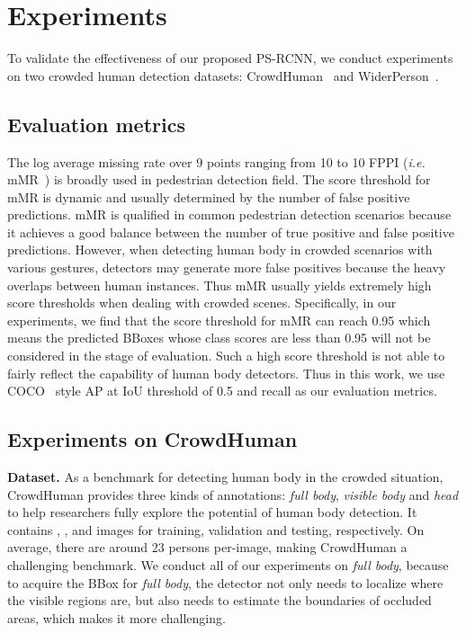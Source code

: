 \documentclass{article}
\begin{document}
\section{Experiments}
\vspace{-0.2cm}

To validate the effectiveness of our proposed PS-RCNN, we conduct experiments on two crowded human detection datasets: CrowdHuman~\cite{CrowdHuman} and WiderPerson~\cite{Zhang2019WiderPerson}.

\subsection{Evaluation metrics}

The log average missing rate over 9 points ranging from 10 to 10 FPPI (\emph{i.e.} mMR~\cite{dollar2011pedestrian}) is broadly used in pedestrian detection field. The score threshold for mMR is dynamic and usually determined by the number of false positive predictions. mMR is qualified in common pedestrian detection scenarios because it achieves a good balance between the number of true positive and false positive predictions. However, when detecting human body in crowded scenarios with various gestures, detectors may generate more false positives because the heavy overlaps between human instances. Thus mMR usually yields extremely high score thresholds when dealing with crowded scenes. Specifically, in our experiments, we find that the score threshold for mMR can reach 0.95 which means the predicted BBoxes whose class scores are less than 0.95 will not be considered in the stage of evaluation. Such a high score threshold is not able to fairly reflect the capability of human body detectors. Thus in this work, we use COCO~\cite{lin2014microsoft} style AP at IoU threshold of 0.5 and recall as our evaluation metrics. 

\subsection{Experiments on CrowdHuman}

\noindent \textbf{Dataset.} As a benchmark for detecting human body in the crowded situation, CrowdHuman provides three kinds of annotations: \textit{full body}, \textit{visible body} and \textit{head} to help researchers fully explore the potential of human body detection. It contains , , and  images for training, validation and testing, respectively. On average, there are around 23 persons per-image, making CrowdHuman a challenging benchmark. We conduct all of our experiments on \textit{full body}, because to acquire the BBox for \textit{full body}, the detector not only needs to localize where the visible regions are, but also needs to estimate the boundaries of occluded areas, which makes it more challenging.
\end{document}
